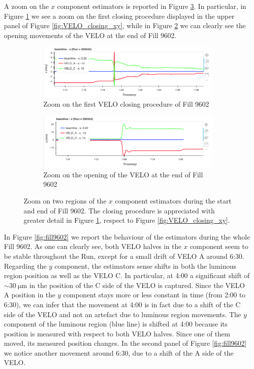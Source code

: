 A zoom on the $x$ component estimators is reported in Figure \ref{zoom_velo}. In particular, in Figure \ref{fig:velo_closing_zoom} we see a zoom on the first closing procedure displayed in the upper panel of Figure \ref{fig:VELO_closing_xy}, while in Figure \ref{fig:velo_opens_zoom} we can clearly see the opening movements of the VELO at the end of Fill 9602.

\begin{figure}
    \centering
    \begin{subfigure}{0.8\textwidth}
    \includegraphics[width=\linewidth]{figures/Velo_closing_zoom.png}
    \caption{Zoom on the first VELO closing procedure of Fill 9602}
    \label{fig:velo_closing_zoom}
    \end{subfigure}\hfill
    \begin{subfigure}{0.8\textwidth}
    \includegraphics[width=\linewidth]{figures/VELO_opens_zoom.png}
    \caption{Zoom on the opening of the VELO at the end of Fill 9602}
    \label{fig:velo_opens_zoom}
    \end{subfigure}
    \caption{Zoom on two regions of the $x$ component estimators during the start and end of Fill 9602. The closing procedure is appreciated with greater detail in Figure \ref{fig:velo_closing_zoom}, respect to Figure \ref{fig:VELO_closing_xy}.}\label{zoom_velo}
\end{figure}
In Figure \ref{fig:fill9602} we report the behaviour of the estimators during the whole Fill 9602. As one can clearly see, both VELO halves in the $x$ component seem to be stable throughout the Run, except for a small drift of VELO A around 6:30. Regarding the $y$ component, the estimators sense shifts in both the luminous region position as well as the VELO C. In particular, at 4:00 a significant shift of $\sim\SI{30}{\micro\meter}$ in the position of the C side of the VELO is captured. Since the VELO A position in the $y$ component stays more or less constant in time (from 2:00 to 6:30), we can infer that the movement at 4:00 is in fact due to a shift of the C side of the VELO and not an artefact due to luminous region movements. The $y$ component of the luminous region (blue line) is shifted at 4:00 because its position is measured with respect to both VELO halves. Since one of them moved, its measured position changes. In the second panel of Figure \ref{fig:fill9602} we notice another movement around 6:30, due to a shift of the A side of the VELO.
